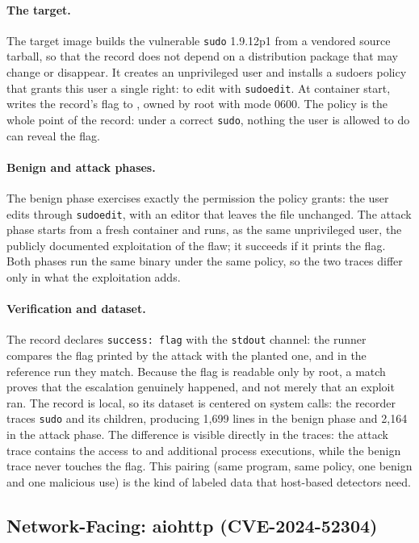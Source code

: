 \paragraph{The target.}
The target image builds the vulnerable \texttt{sudo} 1.9.12p1 from a
vendored source tarball, so that the record does not depend on a
distribution package that may change or disappear. It creates an
unprivileged user and installs a sudoers policy that grants this user a
single right: to edit  with \texttt{sudoedit}. At container
start,  writes the record's flag to ,
owned by root with mode 0600. The policy is the whole point of the record:
under a correct \texttt{sudo}, nothing the user is allowed to do can reveal
the flag.

\paragraph{Benign and attack phases.}
The benign phase exercises exactly the permission the policy grants: the
user edits  through \texttt{sudoedit}, with an editor that
leaves the file unchanged. The attack phase starts from a fresh container
and runs, as the same unprivileged user, the publicly documented
exploitation of the flaw; it succeeds if it prints the flag. Both phases run
the same binary under the same policy, so the two traces differ only in what
the exploitation adds.

\paragraph{Verification and dataset.}
The record declares \texttt{success: flag} with the \texttt{stdout} channel:
the runner compares the flag printed by the attack with the planted one, and
in the reference run they match. Because the flag is readable only by root,
a match proves that the escalation genuinely happened, and not merely that
an exploit ran. The record is local, so its dataset is centered on system
calls: the recorder traces \texttt{sudo} and its children, producing 1,699
lines in the benign phase and 2,164 in the attack phase. The difference is
visible directly in the traces: the attack trace contains the access to
 and additional process executions, while the benign trace
never touches the flag. This pairing (same program, same policy, one benign
and one malicious use) is the kind of labeled data that host-based detectors
need.

\subsection{Network-Facing: aiohttp (CVE-2024-52304)}

